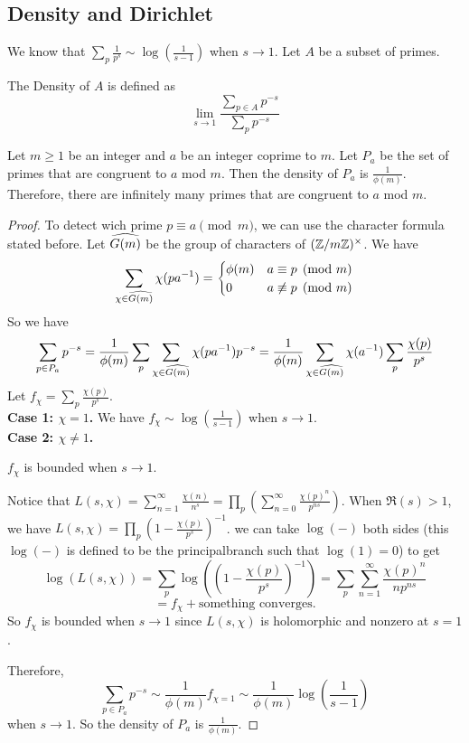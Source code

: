 \documentclass[15pt]{scrartcl}
\begin{document}
\subsection{Density and Dirichlet}
We know that $\sum_p \frac{1}{p^s}\sim \log(\frac{1}{s-1})$ when $s\to 1$. Let $A$ be a subset of primes. 
\begin{definition}
    The Density of $A$ is defined as 
    \[\lim_{s\to 1}\frac{\sum_{p\in A}p^{-s}}{\sum_p p^{-s}}\] 
\end{definition}
\begin{theorem}
    Let $m\geq 1$ be an integer and $a$ be an integer coprime to $m$.  Let $P_a$ be the set of primes that are congruent to $a$ mod $m$. Then the density of $P_a$ is $\frac{1}{\phi(m)}$. Therefore, there are infinitely many primes that are congruent to $a$ mod $m$.
\end{theorem}
\begin{proof}
    To detect wich prime $p\equiv a \pmod m$, we can use the character formula stated before. Let $\widehat{G(m)}$ be the group of characters of $(\mathbb Z/m\mathbb Z)^\times$. We have \[\sum_{\chi\in \widehat{G(m)}}\chi(p a^{-1})=\begin{cases} \phi(m) & a\equiv p \pmod m 
        \\
        0 & a\not\equiv p \pmod m
        \end{cases}\]
    So we have 
    \[\sum_{p\in P_a}p^{-s}=\frac{1}{\phi(m)}\sum_p \sum_{\chi\in \widehat{G(m)}} \chi(p a^{-1})p^{-s}=\frac{1}{\phi(m)} \sum_{\chi\in \widehat{G(m)}} \chi(a^{-1}) \sum_p \frac{\chi(p)}{p^s}\]
    Let $f_\chi=\sum_p \frac{\chi(p)}{p^s}$.
    \\

    \textbf{Case 1: $\chi=1$.} We have $f_\chi\sim \log(\frac{1}{s-1})$ when $s\to 1$.
    \\

    \textbf{Case 2: $\chi\neq 1$.} \begin{claim}
        $f_\chi$ is bounded when $s\to 1$.
        \begin{subproof}
            Notice that $L(s,\chi)=\sum_{n=1}^\infty \frac{\chi(n)}{n^s}=\prod_{p} (\sum_{n=0}^{\infty} \frac{\chi(p)^n}{p^{ns}})$. When $\Re(s)>1$, we have $L(s,\chi)=\prod_p (1-\frac{\chi(p)}{p^s})^{-1}$. we can take $\log(-)$ both sides (this $\log(-)$ is defined to be the principalbranch such that $\log(1)=0$) to get 
            \[\log(L(s,\chi))=\sum_p \log((1-\frac{\chi(p)}{p^s})^{-1})=\sum_p \sum_{n=1}^\infty \frac{\chi(p)^n}{n p^{ns}}\]\[=f_\chi+ \text{something converges}.\] So $f_\chi$ is bounded when $s\to 1$ since $L(s,\chi)$ is holomorphic and nonzero at $s=1$. 
        \end{subproof} 
    \end{claim}
    Therefore, \[\sum_{p\in P_a}p^{-s}\sim \frac{1}{\phi(m)} f_{\chi=1}\sim \frac{1}{\phi(m)} \log(\frac{1}{s-1})\] when $s\to 1$. So the density of $P_a$ is $\frac{1}{\phi(m)}$.


\end{proof}
\end{document}
